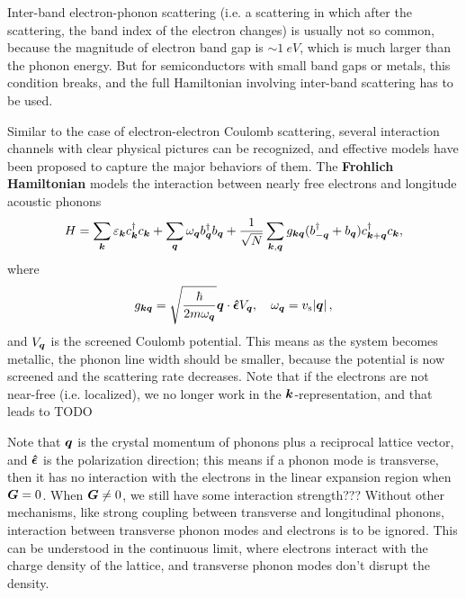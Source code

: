 \documentclass[hyperref, a4paper]{article}
\newcommand*{\concept}[1]{{\textbf{#1}}}
\begin{document}
Inter-band electron-phonon scattering 
(i.e. a scattering in which after the scattering, 
the band index of the electron changes)
is usually not so common, 
because the magnitude of electron band gap is $\sim \SI{1}{eV}$,
which is much larger than the phonon energy.
But for semiconductors with small band gaps or metals, 
this condition breaks, 
and the full Hamiltonian involving inter-band scattering has to be used. 

Similar to the case of electron-electron Coulomb scattering, 
several interaction channels with clear physical pictures can be recognized,
and effective models have been proposed to capture the major behaviors of them.
The \concept{Frohlich Hamiltonian} models 
the interaction between nearly free electrons 
and longitude acoustic phonons
\begin{equation}
    H = \sum_{\vb*{k}} \varepsilon_{\vb*{k}} c^\dagger_{\vb*{k}} c_{\vb*{k}}
    + \sum_{\vb*{q}} \omega_{\vb*{q}} b^\dagger_{\vb*{q}} b_{\vb*{q}}
    + \frac{1}{\sqrt{N}} \sum_{\vb*{k}, \vb*{q}} 
    g_{\vb*{k} \vb*{q}} (b_{- \vb*{q}}^\dagger + b_{\vb*{q}}) c^\dagger_{\vb*{k} + \vb*{q}} c_{\vb*{k}},
\end{equation}
where 
\begin{equation} 
    g_{\vb*{k} \vb*{q}} = \sqrt{\frac{\hbar}{2 m \omega_{\vb*{q}}}} \vb*{q} \cdot \vu*{\epsilon} V_{\vb*{q}}, 
    \quad \omega_{\vb*{q}} = v_{\text{s}} \abs*{\vb*{q}}, 
\end{equation}
and $V_{\vb*{q}}$ is the screened Coulomb potential.
This means as the system becomes metallic, 
the phonon line width should be smaller, 
because the potential is now screened 
and the scattering rate decreases.
Note that if the electrons are not near-free (i.e. localized), 
we no longer work in the $\vb*{k}$-representation, 
and that leads to TODO

Note that $\vb*{q}$ is the crystal momentum of phonons
plus a reciprocal lattice vector, 
and $\vu*{\epsilon}$ is the polarization direction;
this means if a phonon mode is transverse, 
then it has no interaction with the electrons 
in the linear expansion region
when $\vb*{G} = 0$.
When $\vb*{G} \neq 0$, 
we still have some interaction strength???
Without other mechanisms, like strong coupling between transverse and longitudinal phonons, 
interaction between transverse phonon modes and electrons 
is to be ignored.
This can be understood in the continuous limit,
where electrons interact with the charge density of the lattice,
and transverse phonon modes don't 
disrupt the density.
\end{document}
